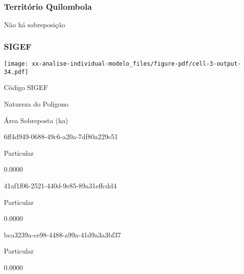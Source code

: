 \documentclass[
  11pt,
  a4paper,
  DIV=11,
  numbers=noendperiod]{scrartcl}
\begin{document}
\subsubsection{Território Quilombola}\label{territuxf3rio-quilombola-1}

Não há sobreposição

\subsubsection{SIGEF}\label{sigef-1}

\texttt{[image: xx-analise-individual-modelo\_files/figure-pdf/cell-3-output-34.pdf]}

\n  

\n    

\n      

Código SIGEF

\n      

Natureza do Polígono

\n      

Área Sobreposta (ha)

\n    

\n  

\n  

\n    

\n      

6ff4d949-0688-49c6-a20a-7df80a229c51

\n      

Particular

\n      

0.0000

\n    

\n    

\n      

41af1f06-2521-440d-9e85-89a31effcdd4

\n      

Particular

\n      

0.0000

\n    

\n    

\n      

bca3239a-ce98-4488-a99a-41d9a3a3bf37

\n      

Particular

\n      

0.0000

\n    

\n    

\n      
\end{document}
